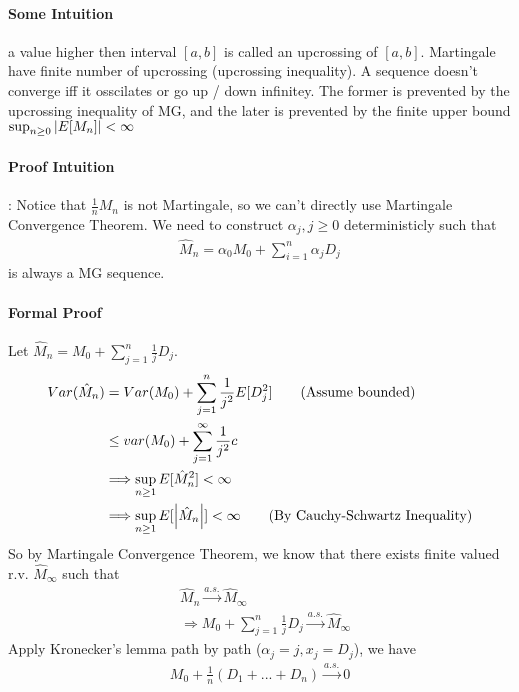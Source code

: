 \paragraph{Some Intuition} a value higher then interval $[a,b]$ is called an upcrossing of $[a,b]$. Martingale have finite number of upcrossing (upcrossing inequality). A sequence doesn't converge iff it osscilates or go up / down infinitey. The former is prevented by the upcrossing inequality of MG, and the later is prevented by the finite upper bound $\sup_{n\geq 0}\left| E[M_n] \right| < \infty$

\paragraph{Proof Intuition}: Notice that $\frac{1}{n} M_n$ is not Martingale, so we can't directly use Martingale Convergence Theorem. We need to construct $\alpha_j, j \geq 0$ deterministicly such that 
    \begin{align*}
        \hat{M}_n = \alpha_0 M_0 + \sum_{i=1}^n \alpha_jD_j
    \end{align*}
is always a MG sequence. 

\paragraph{Formal Proof} 
Let $\hat{M}_n = M_0 + \sum_{j=1}^n \frac{1}{j} D_j$. 
    \begin{align*}
        Var(\hat{M}_n) 
        & = Var(M_0) + \sum_{j=1}^n \frac{1}{j^2} E[D_j^2] \tag{Assume bounded}\\
        & \leq var(M_0) + \sum_{j=1}^\infty \frac{1}{j^2} c \\
        & \Longrightarrow \sup_{n\geq 1} E[\hat{M}_n^2] < \infty \\
        & \Longrightarrow \sup_{n \geq 1} E[\left| \hat{M}_n \right|] < \infty \tag{By Cauchy-Schwartz Inequality} \\
    \end{align*}
So by Martingale Convergence Theorem, we know that there exists finite valued r.v. $\hat{M}_\infty$ such that 
    \begin{align*}
        & \hat{M}_n \overset{a.s.}{\to} \hat{M}_\infty \\
        & \Longrightarrow M_0 + \sum_{j=1}^n \frac{1}{j} D_j \overset{a.s.}{\to} \hat{M}_\infty 
    \end{align*}
Apply Kronecker's lemma path by path ($\alpha_j = j, x_j = D_j$), we have 
    \begin{align*}
        M_0 + \frac{1}{n} (D_1 + ... + D_n) \overset{a.s.}{\to} 0
    \end{align*}

